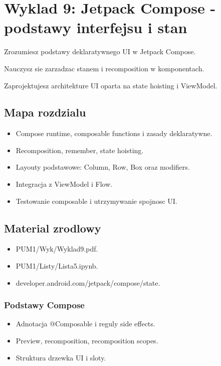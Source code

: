 \chapter{Wyklad 9: Jetpack Compose - podstawy interfejsu i stan}

\begin{learningobjectives}
  \item Zrozumiesz podstawy deklaratywnego UI w Jetpack Compose.
  \item Nauczysz sie zarzadzac stanem i recomposition w komponentach.
  \item Zaprojektujesz architekture UI oparta na state hoisting i ViewModel.
\end{learningobjectives}

\section{Mapa rozdzialu}
\begin{itemize}
  \item Compose runtime, composable functions i zasady deklaratywne.
  \item Recomposition, remember, state hoisting.
  \item Layouty podstawowe: Column, Row, Box oraz modifiers.
  \item Integracja z ViewModel i Flow.
  \item Testowanie composable i utrzymywanie spojnosc UI.
\end{itemize}

\section{Material zrodlowy}
\begin{itemize}
  \item PUM1/Wyk/Wyklad9.pdf.
  \item PUM1/Listy/Lista5.ipynb.
  \item developer.android.com/jetpack/compose/state.
\end{itemize}

\subsection{Podstawy Compose}
\begin{itemize}
  \item Adnotacja @Composable i reguly side effects.
  \item Preview, recomposition, recomposition scopes.
  \item Struktura drzewka UI i sloty.
\end{itemize}

